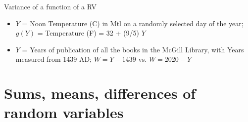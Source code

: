 \documentclass[10pt,handout]{beamer}\usepackage[]{graphicx}\usepackage[]{color}
\begin{document}
\begin{frame}{Variance of a function of a RV}
	
\begin{itemize}
\setlength{\itemsep}{20pt}		
\item $Y$ = Noon Temperature (C) in Mtl on a randomly selected day of the year;  $g(Y)$ = Temperature (F) = 32 + (9/5) $Y$ \pause
\item $Y$ = Years of publication of all the books in the McGill Library, with Years measured from 1439 AD;  $W = Y - 1439$ vs. $W = 2020 - Y$
\end{itemize}	

\end{frame}




\section{Sums, means, differences of random variables}
\end{document}
